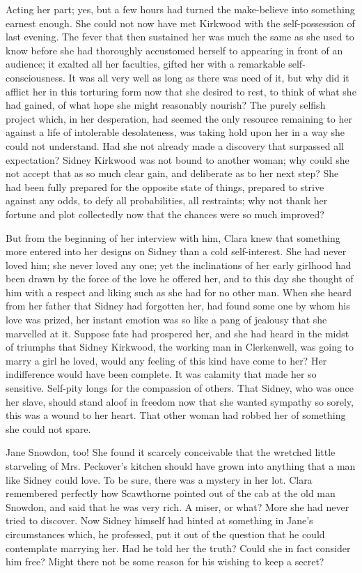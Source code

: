 Acting her part; yes, but a few hours had turned the make-believe into
something earnest enough. She could not now have met Kirkwood with the
self-possession of last evening. The fever that then sustained her was
much the same as she used to know before she had thoroughly accustomed
herself to appearing in front of an audience; it exalted all her
faculties, gifted her with a remarkable self-consciousness. It was all
very well as long as there was need of it, but why did it afflict her in
this torturing form now that she desired to rest, to think of what she
had gained, of what hope she might reasonably nourish? The purely
selfish project which, in her desperation, had seemed the only resource
remaining to her against a life of intolerable desolateness, was taking
hold upon her in a way she could not {}understand. Had she not already
made a discovery that surpassed all expectation? Sidney Kirkwood was not
bound to another woman; why could she not accept that as so much clear
gain, and deliberate as to her next step? She had been fully prepared
for the opposite state of things, prepared to strive against any odds,
to defy all probabilities, all restraints; why not thank her fortune and
plot collectedly now that the chances were so much improved?

But from the beginning of her interview with him, Clara knew that
something more entered into her designs on Sidney than a cold
self-interest. She had never loved him; she never loved any one; yet the
inclinations of her early girlhood had been drawn by the force of the
love he offered her, and to this day she thought of him with a respect
and liking such as she had for no other man. When she heard from her
father that Sidney had forgotten her, had found some one by whom his
love was prized, her instant emotion was so like a pang of jealousy that
she marvelled at it. Suppose fate had prospered her, and she had heard
in the midst of triumphs that Sidney Kirkwood, the working man in
Clerkenwell, was going to {}marry a girl he loved, would any feeling of
this kind have come to her? Her indifference would have been complete.
It was calamity that made her so sensitive. Self-pity longs for the
compassion of others. That Sidney, who was once her slave, should stand
aloof in freedom now that she wanted sympathy so sorely, this was a
wound to her heart. That other woman had robbed her of something she
could not spare.

Jane Snowdon, too! She found it scarcely conceivable that the wretched
little starveling of Mrs. Peckover's kitchen should have grown into
anything that a man like Sidney could love. To be sure, there was a
mystery in her lot. Clara remembered perfectly how Scawthorne pointed
out of the cab at the old man Snowdon, and said that he was very rich. A
miser, or what? More she had never tried to discover. Now Sidney himself
had hinted at something in Jane's circumstances which, he professed, put
it out of the question that he could contemplate marrying her. Had he
told her the truth? Could she in fact consider him free? Might there not
be some reason for his wishing to keep a secret?

